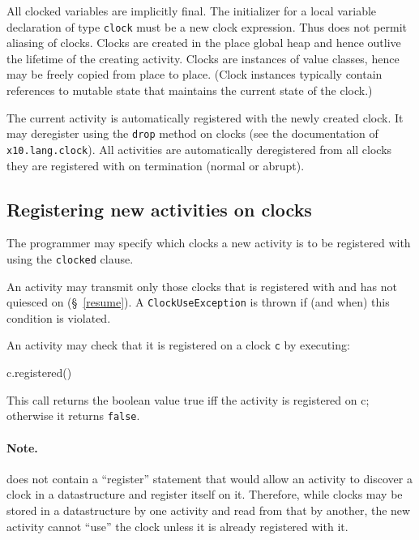 All clocked variables are implicitly final. The initializer for a
local variable declaration of type {\tt clock} must be a new clock
expression. Thus \Xten{} does not permit aliasing of clocks.
Clocks are created in the place global heap and hence outlive the
lifetime of the creating activity.  Clocks are instances of value
classes, hence may be freely copied from place to
place. (Clock instances typically contain references to mutable state
that maintains the current state of the clock.)

The current activity is automatically registered with the newly
created clock.  It may deregister using the {\tt drop} method on
clocks (see the documentation of {\tt x10.lang.clock}). All activities
are automatically deregistered from all clocks they are registered
with on termination (normal or abrupt).

\subsection{Registering new activities on clocks}
\label{sec:clock:register}

The programmer may specify which clocks a new activity is to be
registered with using the {\tt clocked} clause.

An activity may transmit only those clocks that is registered with and
has not quiesced on (\S~\ref{resume}). 
A {\tt ClockUseException} is thrown if (and when) 
this condition is violated.

An activity may check that it is registered on a clock {\tt c} by
executing:
\begin{x10}
c.registered()
\end{x10}
\noindent This call returns the {\cf boolean} value {\cf true} iff the
activity is registered on {\cf c}; otherwise it returns {\tt false}.

\paragraph{Note.} 
\Xten{} does not contain a ``register'' statement that would allow an
activity to discover a clock in a datastructure and register itself on
it. Therefore, while clocks may be stored in a datastructure by one
activity and read from that by another, the new activity cannot
``use'' the clock unless it is already registered with it.


